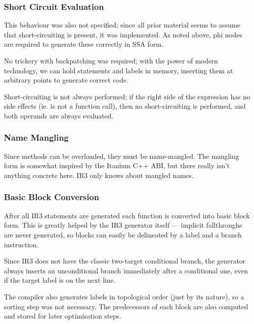 \documentclass[12pt]{article}
\begin{document}



\subsubsection{Short Circuit Evaluation}

This behaviour was also not specified; since all prior material seems to assume that short-circuiting is present, it was
implemented. As noted above, phi nodes are required to generate these correctly in SSA form.

No trickery with backpatching was required; with the power of modern technology, we can hold statements and labels in memory,
inserting them at arbitrary points to generate correct code.

Short-circuiting is not always performed; if the right side of the expression has no side effects (ie. is not a function
call), then no short-circuiting is performed, and both operands are always evaluated.




\subsubsection{Name Mangling}

Since methods can be overloaded, they must be name-mangled. The mangling form is somewhat inspired by the Itanium C++ ABI,
but there really isn't anything concrete here. IR3 only knows about mangled names.




\subsubsection{Basic Block Conversion}

After all IR3 statements are generated each function is converted into basic block form. This is greatly helped by
the IR3 generator itself --- implicit fallthroughs are never generated, so blocks can easily be delineated by
a label and a branch instruction.

Since IR3 does not have the classic two-target conditional branch, the generator always inserts an unconditional
branch immediately after a conditional one, even if the target label is on the next line.

The compiler also generates labels in topological order (just by its nature), so a sorting step was not necessary. The
predecessors of each block are also computed and stored for later optimisation steps.
\end{document}

